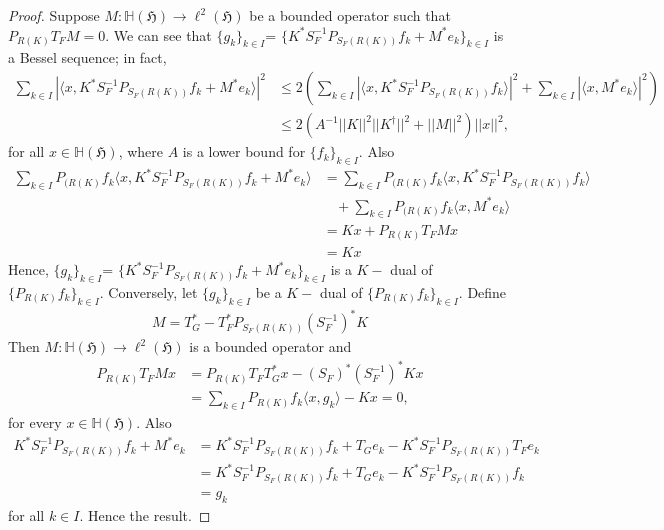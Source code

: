 \documentclass[a4paper,12pt,reqno]{amsart}
\theoremstyle{plain}
\theoremstyle{remark}
\begin{document}
	\begin{proof}
		
		Suppose $M:\mathbb{H}(\mathfrak{H}) \to \ell ^2(\mathfrak{H})$ be a bounded operator such that $P_{R(K)}T_FM=0$.
		We can see that $\{   g_k\}_{k\in I}$= $\{K^* S_F^{-1}P_{S_F(R(K))}f_k + M^*e_k\}_{k\in I}$ is a Bessel sequence; in fact, 
		\begin{align*}
			\sum_{k\in I}|\langle x, K^* S_F^{-1}P_{S_F(R(K))}f_k + M^*e_k\rangle |^2&\le 2\left(\sum_{k\in I} |\langle x, K^* S_F^{-1}P_{S_F(R(K))}f_k\rangle|^2 +\sum_{k\in I}|\langle x,M^*e_k\rangle |^2\right)\\
			&\le 2(A^{-1}||K||^2||K^{\dagger}||^2+||M||^2)||x||^2,
		\end{align*}
		for all $x\in \mathbb{H}(\mathfrak{H})$, where $A$ is a lower bound for $\{f_k\}_{k\in I}$. Also
		\begin{align*}
			\sum_{k\in I} P_{(R(K)}f_k\langle x, K^* S_F^{-1}P_{S_F(R(K))}f_k +M^*e_k\rangle  &=\sum_{k\in I}P_{(R(K)}f_k\langle x, K^* S_F^{-1}P_{S_F(R(K))}f_k\rangle \\ &\ \ \ \ +\sum_{k\in I}P_{(R(K)}f_k\langle x, M^*e_k\rangle \\
			&=Kx+ P_{R(K)}T_FMx\\
			&=Kx
		\end{align*}
		Hence, $\{   g_k\}_{k\in I}$= $\{K^* S_F^{-1}P_{S_F(R(K))}f_k + M^*e_k\}_{k\in I}$ is a $K-$ dual of $\{P_{R(K)}f_k\}_{k\in  I}$. Conversely, let $\{g_k\}_{k\in I}$ be a $K-$ dual of $\{P_{R(K)}f_k\}_{k\in I}$. Define
		\begin{align*}
			M=T_G^*-T_F^*P_{S_F(R(K))}(S_F^{-1})^*K
		\end{align*}
		Then $M: \mathbb{H}(\mathfrak{H}) \to \ell ^2(\mathfrak{H})$ is a bounded operator and
		\begin{align*}
			P_{R(K)}T_FMx&=P_{R(K)}T_FT_G^*x-(S_F)^*(S_F^{-1})^*Kx\\
			&=\sum_{k\in I}P_{R(K)}f_k \langle x, g_k \rangle -Kx=0,
		\end{align*}
		for every $x\in \mathbb{H}(\mathfrak{H})$. Also
		\begin{align*}
			K^* S_F^{-1}P_{S_F(R(K))}f_k + M^*e_k&=   K^* S_F^{-1}P_{S_F(R(K))}f_k+T_Ge_k-K^*S_F^{-1}P_{S_F(R(K))}T_Fe_k\\
			&= K^* S_F^{-1}P_{S_F(R(K))}f_k+T_Ge_k-K^*S_F^{-1}P_{S_F(R(K))}f_k\\
			&=g_k
		\end{align*}
		for all $k\in I$. Hence the result.
	\end{proof}
	
\end{document}
